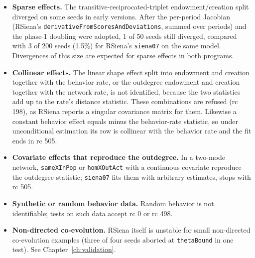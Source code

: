 \begin{itemize}
\item \textbf{Sparse effects.} The transitive-reciprocated-triplet endowment/creation split diverged on some seeds in early versions. After the per-period Jacobian (RSiena's \texttt{derivativeFromScoresAndDeviations}, summed over periods) and the phase-1 doubling were adopted, 1 of 50 seeds still diverged, compared with 3 of 200 seeds (1.5\%) for RSiena's \texttt{siena07} on the same model. Divergences of this size are expected for sparse effects in both programs.
\item \textbf{Collinear effects.} The linear shape effect split into endowment and creation together with the behavior rate, or the outdegree endowment and creation together with the network rate, is not identified, because the two statistics add up to the rate's distance statistic. These combinations are refused (rc 198), as RSiena reports a singular covariance matrix for them. Likewise a constant behavior effect equals minus the behavior-rate statistic, so under unconditional estimation its row is collinear with the behavior rate and the fit ends in rc 505.
\item \textbf{Covariate effects that reproduce the outdegree.} In a two-mode network, \texttt{sameXInPop} or \texttt{homXOutAct} with a continuous covariate reproduce the outdegree statistic; \texttt{siena07} fits them with arbitrary estimates, \nwsaom{} stops with rc 505.
\item \textbf{Synthetic or random behavior data.} Random behavior is not identifiable; tests on such data accept rc 0 or rc 498.
\item \textbf{Non-directed co-evolution.} RSiena itself is unstable for small non-directed co-evolution examples (three of four seeds aborted at \texttt{thetaBound} in one test). See Chapter~\ref{ch:validation}.
\end{itemize}

